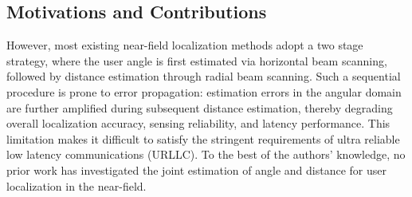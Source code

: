 \documentclass[lettersize,journal]{IEEEtran}
\begin{document}
\subsection{Motivations and Contributions}
However, most existing near-field localization methods adopt a two stage strategy, where the user angle is first estimated via horizontal beam scanning, followed by distance estimation through radial beam scanning. Such a sequential procedure is prone to error propagation: estimation errors in the angular domain are further amplified during subsequent distance estimation, thereby degrading overall localization accuracy, sensing reliability, and latency performance. This limitation makes it difficult to satisfy the stringent requirements of ultra reliable low latency communications (URLLC). To the best of the authors’ knowledge, no prior work has investigated the joint estimation of angle and distance for user localization in the near-field.
\end{document}
